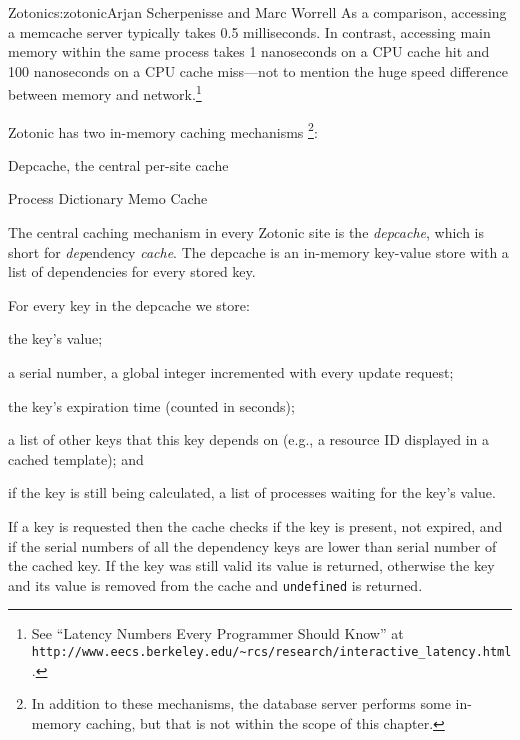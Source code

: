 \begin{aosachapter}{Zotonic}{s:zotonic}{Arjan Scherpenisse and Marc Worrell}
As a comparison, accessing a memcache server typically takes 0.5
milliseconds. In contrast, accessing main memory within the same process
takes 1 nanoseconds on a CPU cache hit and 100 nanoseconds on a CPU
cache miss---not to mention the huge speed difference between memory and
network.\footnote{See ``Latency Numbers Every Programmer Should Know''
  at
  \newline \texttt{http://www.eecs.berkeley.edu/\textasciitilde{}rcs/research/interactive\_latency.html}.}

Zotonic has two in-memory caching mechanisms \footnote{In addition to
  these mechanisms, the database server performs some in-memory caching,
  but that is not within the scope of this chapter.}:

\begin{aosaenumerate}
\def\labelenumi{\arabic{enumi}.}

\item
  Depcache, the central per-site cache
\item
  Process Dictionary Memo Cache
\end{aosaenumerate}


\label{posa.zotonic.depcache}

The central caching mechanism in every Zotonic site is the
\emph{depcache}, which is short for \emph{dep}endency \emph{cache}. The
depcache is an in-memory key-value store with a list of dependencies for
every stored key.

For every key in the depcache we store:

\begin{aosaitemize}

\item
  the key's value;
\item
  a serial number, a global integer incremented with every update
  request;
\item
  the key's expiration time (counted in seconds);
\item
  a list of other keys that this key depends on (e.g., a resource ID
  displayed in a \linebreak cached template); and
\item
  if the key is still being calculated, a list of processes waiting for
  the key's value.
\end{aosaitemize}

If a key is requested then the cache checks if the key is present, not
expired, and if the serial numbers of all the dependency keys are lower
than serial number of the cached key. If the key was still valid its
value is returned, otherwise the key and its value is removed from the
cache and \texttt{undefined} is returned.


\end{aosachapter}
